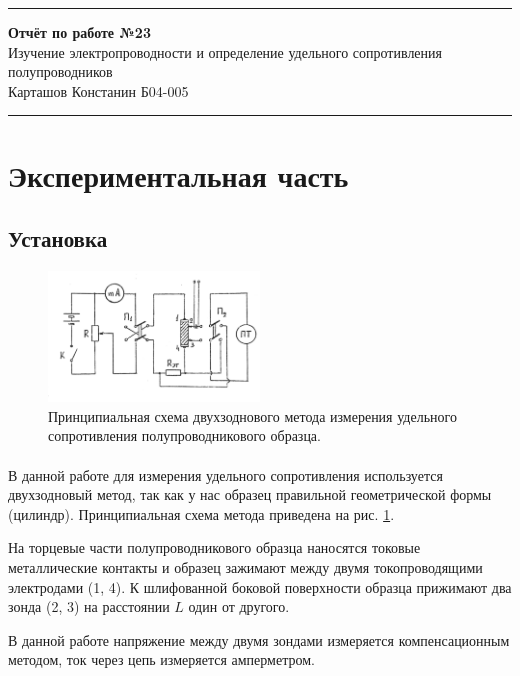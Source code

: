 \documentclass[a4paper,12pt]{article} %
\begin{document}


\hrule 	
\medskip
\begin{raggedright}
{\large \textbf{Отчёт по работе №23}}
\\
\medskip
{\Large Изучение электропроводности и определение удельного сопротивления полупроводников} 
\\
\medskip
{\large Карташов Констанин Б04-005}
\medskip
\hrule
\medskip
\end{raggedright}



\section{Экспериментальная часть}

\subsection{Установка}

\begin{figure}[h]
\centering
\includegraphics[width=0.5\textwidth]{setup.png}
\caption{Принципиальная схема двухзоднового метода измерения удельного сопротивления полупроводникового образца.}
\label{fig:setup}
\end{figure}

\paragraph{} В данной работе для измерения удельного сопротивления используется двухзодновый метод, так как у нас образец правильной геометрической формы (цилиндр). Принципиальная схема метода приведена на рис. \ref{fig:setup}.

На торцевые части полупроводникового образца наносятся токовые металлические контакты и образец зажимают между двумя токопроводящими электродами (1, 4). К шлифованной боковой поверхности образца прижимают два зонда (2, 3) на расстоянии $L$ один от другого. 

В данной работе напряжение между двумя зондами измеряется компенсационным методом, ток через цепь измеряется амперметром.
\end{document}
